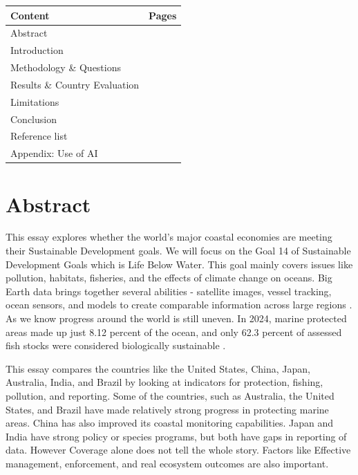 \documentclass[12pt,letterpaper]{article}
\begin{document}
\begin{center}
\begin{tabular}{>{\raggedright\arraybackslash}p{}
>{\centering\arraybackslash}p{}}
\toprule
\textbf{Content} & \textbf{Pages} \\
\midrule
Abstract & \pageref{sec:abstract} \\
Introduction & \pageref{sec:introduction} \\
Methodology \& Questions & \pageref{sec:methodology} \\
Results \& Country Evaluation & \pageref{sec:results} \\
Limitations & \pageref{sec:limitations} \\
Conclusion & \pageref{sec:conclusion} \\
Reference list & \pageref{sec:references} \\
Appendix: Use of AI & \pageref{sec:appendix} \\
\bottomrule
\end{tabular}
\end{center}


\section{Abstract}
\label{sec:abstract}
This essay explores whether the world's major coastal economies are meeting their Sustainable Development goals. We will focus on the Goal 14 of Sustainable Development Goals which is Life Below Water. This goal mainly covers issues like pollution, habitats, fisheries, and the effects of climate change on oceans. Big Earth data brings together several abilities - satellite images, vessel tracking, ocean sensors, and models to create comparable information across large regions \parencite{unep2024}. As we know progress around the world is still uneven. In 2024, marine protected areas made up just 8.12 percent of the ocean, and only 62.3 percent of assessed fish stocks were considered biologically sustainable \parencite{un2024}.
 
This essay compares the countries like the United States, China, Japan, Australia, India, and Brazil by looking at indicators for protection, fishing, pollution, and reporting. Some of the countries, such as Australia, the United States, and Brazil have made relatively strong progress in protecting marine areas. China has also improved its coastal monitoring capabilities. Japan and India have strong policy or species programs, but both have gaps in reporting of data. However Coverage alone does not tell the whole story. Factors like Effective management, enforcement, and real ecosystem outcomes are also important.
\end{document}
